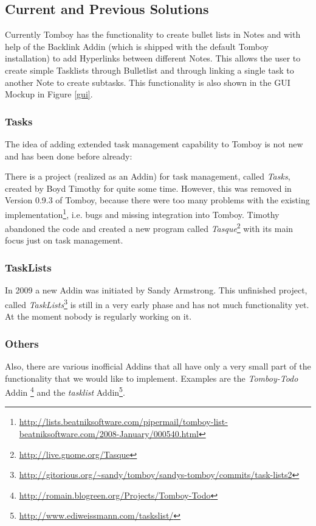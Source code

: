 \subsection{Current and Previous Solutions}
\label{description:solution}
Currently Tomboy has the functionality to create bullet lists in Notes and with help of the Backlink Addin (which is shipped with the default Tomboy installation) to add Hyperlinks between different Notes. This allows the user to create simple Tasklists through Bulletlist and through linking a single task to another Note to create subtasks. This functionality is also shown in the GUI Mockup in Figure \ref{gui}.

\subsubsection{Tasks} The idea of adding extended task management capability to Tomboy is not new and has been done before already:

There is a project (realized as an Addin) for task management, called \textit{Tasks}, created by Boyd Timothy for quite some time. However, this was removed in Version 0.9.3 of Tomboy, because there were too many problems with the existing implementation\footnote{\url{http://lists.beatniksoftware.com/pipermail/tomboy-list-beatniksoftware.com/2008-January/000540.html}}, i.e. bugs and missing integration into Tomboy.
Timothy abandoned the code and created a new program called \textit{Tasque}\footnote{\url{http://live.gnome.org/Tasque}} with its main focus just on task management.

\subsubsection{TaskLists}
In 2009 a new Addin was initiated by Sandy Armstrong. This unfinished project, called \textit{TaskLists}\footnote{\url{http://gitorious.org/~sandy/tomboy/sandys-tomboy/commits/task-lists2}} is still in a very early phase and has not much functionality yet. At the moment nobody is regularly working on it.

\subsubsection{Others}
Also, there are various inofficial Addins that all have only a very small part of the functionality that we would like to implement. Examples are the \textit{Tomboy-Todo}
Addin \footnote{\url{http://romain.blogreen.org/Projects/Tomboy-Todo}} and the \textit{tasklist} Addin\footnote{\url{http://www.ediweissmann.com/taskslist/}}.

